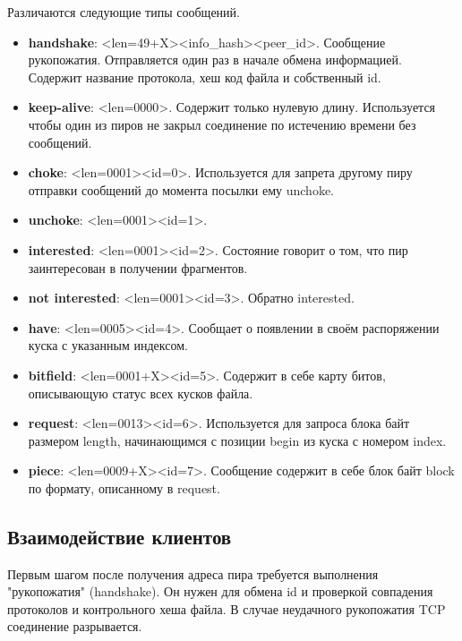 Различаются следующие типы сообщений.
\begin{itemize}
	\item \textbf{handshake}: <len=49+X><info\_hash><peer\_id>. Сообщение рукопожатия. Отправляется один раз в начале обмена информацией. Содержит название протокола, хеш код файла и собственный id.
	
	\item \textbf{keep-alive}: <len=0000>. Содержит только нулевую длину. Используется чтобы один из пиров не закрыл соединение по истечению времени без сообщений.
	
	\item \textbf{choke}: <len=0001><id=0>. Используется для запрета другому пиру отправки сообщений до момента посылки ему unchoke.
	
	\item \textbf{unchoke}: <len=0001><id=1>.

	\item \textbf{interested}: <len=0001><id=2>. Состояние говорит о том, что пир заинтересован в получении фрагментов.
	
	\item \textbf{not interested}: <len=0001><id=3>. Обратно interested.
	
	\item \textbf{have}: <len=0005><id=4>. Сообщает о появлении в своём распоряжении куска с указанным индексом.
	
	\item \textbf{bitfield}: <len=0001+X><id=5>. Содержит в себе карту битов, описывающую статус всех кусков файла.
	
	\item \textbf{request}: <len=0013><id=6>. Используется для запроса блока байт размером length, начинающимся с позиции begin из куска с номером index.
	
	\item \textbf{piece}: <len=0009+X><id=7>. Сообщение содержит в себе блок байт block по формату, описанному в request. \newline
\end{itemize}

\subsection{Взаимодействие клиентов}
Первым шагом после получения адреса пира требуется выполнения "рукопожатия" (handshake). Он нужен для обмена id и проверкой совпадения протоколов и контрольного хеша файла. В случае неудачного рукопожатия TCP соединение разрывается.

